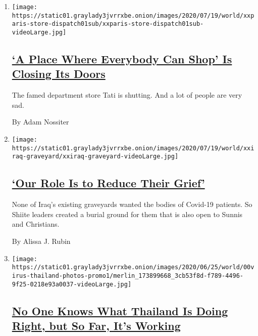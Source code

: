 \begin{enumerate}
\def\labelenumi{\arabic{enumi}.}
\item
  \texttt{[image: https://static01.graylady3jvrrxbe.onion/images/2020/07/19/world/xxparis-store-dispatch01sub/xxparis-store-dispatch01sub-videoLarge.jpg]}

  \hypertarget{a-place-where-everybody-can-shop-is-closing-its-doors}{%
  \subsection{\texorpdfstring{\href{/2020/07/20/world/europe/france-paris-tati-coronavirus.html}{`A
  Place Where Everybody Can Shop' Is Closing Its
  Doors}}{`A Place Where Everybody Can Shop' Is Closing Its Doors}}\label{a-place-where-everybody-can-shop-is-closing-its-doors}}

  The famed department store Tati is shutting. And a lot of people are
  very sad.

  By Adam Nossiter
\item
  \texttt{[image: https://static01.graylady3jvrrxbe.onion/images/2020/07/19/world/xxiraq-graveyard/xxiraq-graveyard-videoLarge.jpg]}

  \hypertarget{our-role-is-to-reduce-their-grief}{%
  \subsection{\texorpdfstring{\href{/2020/07/18/world/middleeast/iraq-coronovirus-cemetery.html}{`Our
  Role Is to Reduce Their
  Grief'}}{`Our Role Is to Reduce Their Grief'}}\label{our-role-is-to-reduce-their-grief}}

  None of Iraq's existing graveyards wanted the bodies of Covid-19
  patients. So Shiite leaders created a burial ground for them that is
  also open to Sunnis and Christians.

  By Alissa J. Rubin
\item
  \texttt{[image: https://static01.graylady3jvrrxbe.onion/images/2020/06/25/world/00virus-thailand-photos-promo1/merlin\_173899668\_3cb53f8d-f789-4496-9f25-0218e93a0037-videoLarge.jpg]}

  \hypertarget{no-one-knows-what-thailand-is-doing-right-but-so-far-its-working}{%
  \subsection{\texorpdfstring{\href{/2020/07/16/world/asia/coronavirus-thailand-photos.html}{No
  One Knows What Thailand Is Doing Right, but So Far, It's
  Working}}{No One Knows What Thailand Is Doing Right, but So Far, It's Working}}\label{no-one-knows-what-thailand-is-doing-right-but-so-far-its-working}}


\end{enumerate}
